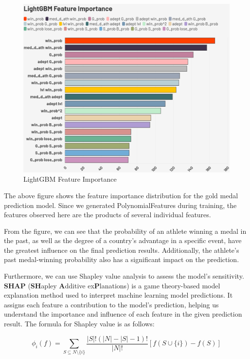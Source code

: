 \documentclass[12pt]{article}  %
\begin{document}
\begin{figure}[H]
	\centering
	\includegraphics[width=13cm]{img/Sensitive Analysis 1.png}
	\caption{LightGBM Feature Importance}
	\label{fig:aa}
\end{figure}

The above figure shows the feature importance distribution for the gold medal prediction model. Since we generated PolynomialFeatures during training, the features observed here are the products of several individual features.

From the figure, we can see that the probability of an athlete winning a medal in the past, as well as the degree of a country's advantage in a specific event, have the greatest influence on the final prediction results. Additionally, the athlete’s past medal-winning probability also has a significant impact on the prediction.

Furthermore, we can use Shapley value analysis\cite{4} to assess the model's sensitivity. \textbf{SHAP} (\textbf{SH}apley \textbf{A}dditive ex\textbf{P}lanations) is a game theory-based model explanation method used to interpret machine learning model predictions. It assigns each feature a contribution to the model's prediction, helping us understand the importance and influence of each feature in the given prediction result. The formula for Shapley value is as follows:


\begin{equation}
	\phi_i(f) = \sum_{S \subseteq N \setminus \{i\}} \frac{|S|!(|N|-|S|-1)!}{|N|!} [ f(S \cup \{i\}) - f(S)]
\end{equation}
\end{document}
